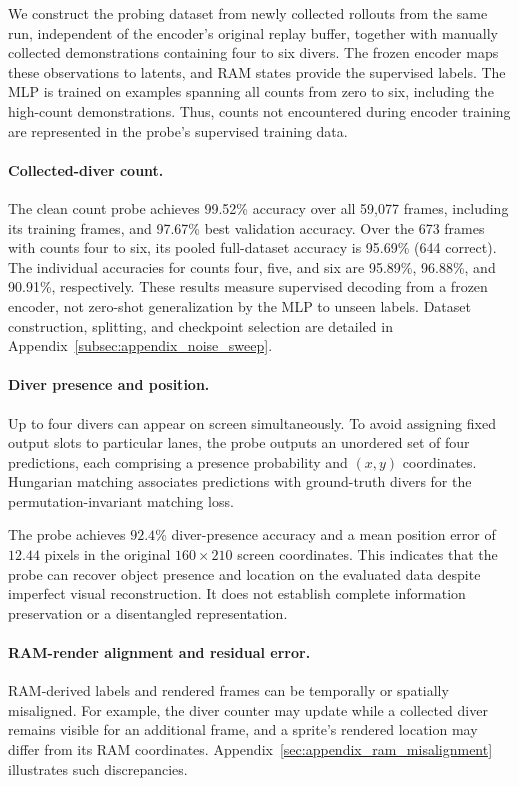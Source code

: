 \documentclass{article} %
\begin{document}
We construct the probing dataset from newly collected rollouts from the same run, independent of the encoder's original replay buffer, together with manually collected demonstrations containing four to six divers. The frozen encoder maps these observations to latents, and RAM states provide the supervised labels. The MLP is trained on examples spanning all counts from zero to six, including the high-count demonstrations. Thus, counts not encountered during encoder training are represented in the probe's supervised training data.

\paragraph{Collected-diver count.}
The clean count probe achieves 99.52\% accuracy over all 59,077 frames, including its training frames, and 97.67\% best validation accuracy. Over the 673 frames with counts four to six, its pooled full-dataset accuracy is 95.69\% (644 correct). The individual accuracies for counts four, five, and six are 95.89\%, 96.88\%, and 90.91\%, respectively. These results measure supervised decoding from a frozen encoder, not zero-shot generalization by the MLP to unseen labels. Dataset construction, splitting, and checkpoint selection are detailed in Appendix~\ref{subsec:appendix_noise_sweep}.

\paragraph{Diver presence and position.}
Up to four divers can appear on screen simultaneously. To avoid assigning fixed output slots to particular lanes, the probe outputs an unordered set of four predictions, each comprising a presence probability and $(x,y)$ coordinates. Hungarian matching associates predictions with ground-truth divers for the permutation-invariant matching loss.

The probe achieves $92.4\%$ diver-presence accuracy and a mean position error of $12.44$ pixels in the original $160\times210$ screen coordinates. This indicates that the probe can recover object presence and location on the evaluated data despite imperfect visual reconstruction. It does not establish complete information preservation or a disentangled representation.

\paragraph{RAM-render alignment and residual error.}
RAM-derived labels and rendered frames can be temporally or spatially misaligned. For example, the diver counter may update while a collected diver remains visible for an additional frame, and a sprite's rendered location may differ from its RAM coordinates. Appendix~\ref{sec:appendix_ram_misalignment} illustrates such discrepancies.
\end{document}
